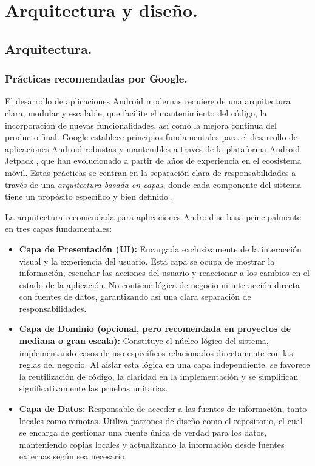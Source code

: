 \section{Arquitectura y diseño.}

\subsection{Arquitectura.}

\subsubsection{Prácticas recomendadas por Google.}

El desarrollo de aplicaciones Android modernas requiere de una arquitectura clara, modular y escalable, que facilite el mantenimiento del código, la incorporación de nuevas funcionalidades, así como la mejora continua del producto final. Google establece principios fundamentales para el desarrollo de aplicaciones Android robustas y mantenibles a través de la plataforma Android Jetpack \cite{Jetpack}, que han evolucionado a partir de años de experiencia en el ecosistema móvil. Estas prácticas se centran en la separación clara de responsabilidades a través de una \textit{arquitectura basada en capas}, donde cada componente del sistema tiene un propósito específico y bien definido \cite{AndroidBestPractices}. 

La arquitectura recomendada para aplicaciones Android se basa principalmente en tres capas fundamentales:


\begin{itemize}
  \item \textbf{Capa de Presentación (UI):} Encargada exclusivamente de la interacción visual y la experiencia del usuario. Esta capa se ocupa de mostrar la información, escuchar las acciones del usuario y reaccionar a los cambios en el estado de la aplicación. No contiene lógica de negocio ni interacción directa con fuentes de datos, garantizando así una clara separación de responsabilidades.

  \item \textbf{Capa de Dominio (opcional, pero recomendada en proyectos de mediana o gran escala):} Constituye el núcleo lógico del sistema, implementando casos de uso específicos relacionados directamente con las reglas del negocio. Al aislar esta lógica en una capa independiente, se favorece la reutilización de código, la claridad en la implementación y se simplifican significativamente las pruebas unitarias.

  \item \textbf{Capa de Datos:} Responsable de acceder a las fuentes de información, tanto locales como remotas. Utiliza patrones de diseño como el repositorio, el cual se encarga de gestionar una fuente única de verdad para los datos, manteniendo copias locales y actualizando la información desde fuentes externas según sea necesario.
\end{itemize}

